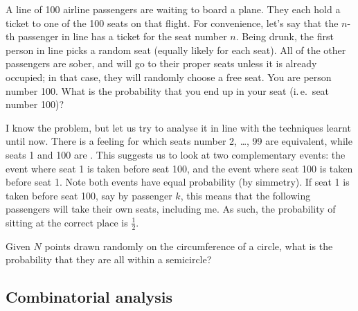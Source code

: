 \begin{qanda} %
    \Q
    A line of 100 airline passengers are waiting to board a plane.
    They each hold a ticket to one of the 100 seats on that flight.
    For convenience, let's say that the $n$-th passenger in line has a ticket for the seat number $n$.
    Being drunk, the first person in line picks a random seat (equally likely for each seat). 
    All of the other passengers are sober, and will go to their proper seats unless it is already occupied; in that case, they will randomly choose a free seat.
    You are person number 100. What is the probability that you end up in your seat (i.\,e.\ seat number 100)?

    \A
    I know the problem, but let us try to analyse it in line with the techniques learnt until now. There is a feeling for which seats number 2, \ldots, 99 are equivalent, while seats 1 and 100 are .
    This suggests us to look at two complementary events: the event where seat 1 is taken before seat 100, and the event where seat 100 is taken before seat 1.
    Note both events have equal probability (by simmetry).
    If seat 1 is taken before seat 100, say by passenger $k$, this means that the following passengers will take their own seats, including me.
    As such, the probability of sitting at the correct place is $\frac{1}{2}$.
\end{qanda}

\begin{qanda} %
  \Q
  Given $N$ points drawn randomly on the circumference of a circle, what is the probability that they are all within a semicircle?
\end{qanda}

\subsection{Combinatorial analysis}

